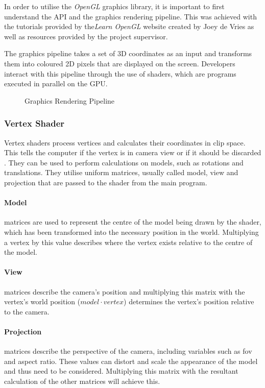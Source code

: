 \documentclass[a4paper, 12pt]{article}
\newcommand{\wideimage}[2][]{%
  \makebox[\textwidth][c]{\texttt{[image: \#2]}}%
}
\begin{document}
    In order to utilise the \textit{OpenGL} graphics library\cite{opengl}, it is important to first understand the API and the graphics rendering pipeline. This was achieved with the tutorials provided by the\textit{Learn OpenGL} website created by Joey de Vries\cite{learnopengl} as well as resources provided by the project supervisor.

    The graphics pipeline takes a set of 3D coordinates as an input and transforms them into coloured 2D pixels that are displayed on the screen. Developers interact with this pipeline through the use of shaders, which are programs executed in parallel on the GPU.

    \begin{figure}[H]
        \wideimage[]{graphicsPipeline.png}
        \caption{Graphics Rendering Pipeline \cite{learnopengl}}
    \end{figure}

    \subsubsection{Vertex Shader}

    Vertex shaders process vertices and calculates their coordinates in clip space. This tells the computer if the vertex is in camera view or if it should be discarded \cite{shadertutorial}. They can be used to perform calculations on models, such as rotations and translations. They utilise uniform matrices, usually called model, view and projection that are passed to the shader from the main program.

    \paragraph{Model}matrices are used to represent the centre of the model being drawn by the shader, which has been transformed into the necessary position in the world. Multiplying a vertex by this value describes where the vertex exists relative to the centre of the model.

    \paragraph{View}matrices describe the camera's position and multiplying this matrix with the vertex's world position ($model \cdot vertex$) determines the vertex's position relative to the camera.

    \paragraph{Projection}matrices describe the perspective of the camera, including variables such as fov and aspect ratio. These values can distort and scale the appearance of the model and thus need to be considered. Multiplying this matrix with the resultant calculation of the other matrices will achieve this.
\end{document}
